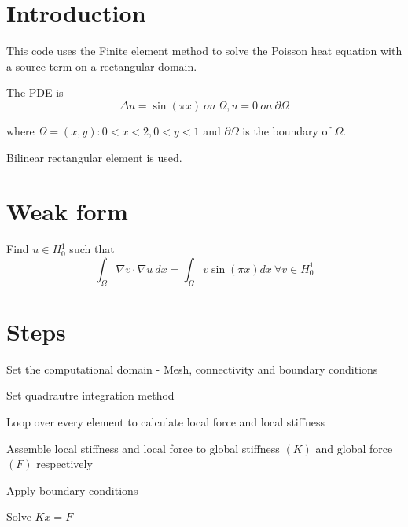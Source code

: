 \hypertarget{index_intro_sec}{}\section{Introduction}\label{index_intro_sec}
This code uses the Finite element method to solve the Poisson heat equation with a source term on a rectangular domain.

The P\+DE is \[ \Delta u = \sin(\pi x)\ on\ \Omega, u = 0\ on\ \partial\Omega \]

where $ \Omega = {(x,y):0<x<2,0<y<1}$ and $\partial\Omega$ is the boundary of $\Omega$.

Bilinear rectangular element is used.\hypertarget{index_install_sec}{}\section{Weak form}\label{index_install_sec}
Find $u\in H_{0}^{1}$ such that \[ \int_{\Omega}\nabla v\cdot\nabla u\ dx=\int_{\Omega}v\sin\left(\pi x\right)dx\ \forall v\in H_{0}^{1} \]\hypertarget{index_steps}{}\section{Steps}\label{index_steps}

\begin{DoxyEnumerate}
\item Set the computational domain -\/ Mesh, connectivity and boundary conditions
\item Set quadrautre integration method
\item Loop over every element to calculate local force and local stiffness
\item Assemble local stiffness and local force to global stiffness $(K)$ and global force $(F)$ respectively
\item Apply boundary conditions
\item Solve $Kx=F$ 
\end{DoxyEnumerate}